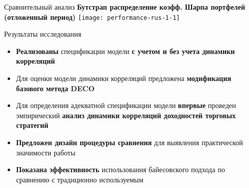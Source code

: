 \documentclass[12pt]{beamer}
\begin{document}
\begin{frame}{Сравнительный анализ}
\textbf{Бутстрап распределение коэфф. Шарпа портфелей\\(отложенный период)}
\texttt{[image: performance-rus-1-1]}
\end{frame}
\begin{frame}{Результаты исследования}
\begin{itemize}
	\item \textbf{Реализованы} спецификации модели \textbf{с учетом и без учета динамики корреляций}
	\item Для оценки модели динамики корреляций предложена \textbf{модификация базового метода DECO}
	\item Для определения адекватной спецификации модели \textbf{впервые} проведен эмпирический \textbf{анализ динамики корреляций доходностей торговых стратегий}
	\item \textbf{Предложен дизайн процедуры сравнения} для выявления практической значимости работы
	\item \textbf{Показана эффективность} использования байесовского подхода по сравнению с традиционно используемым
\end{itemize}
\end{frame}
\end{document}
